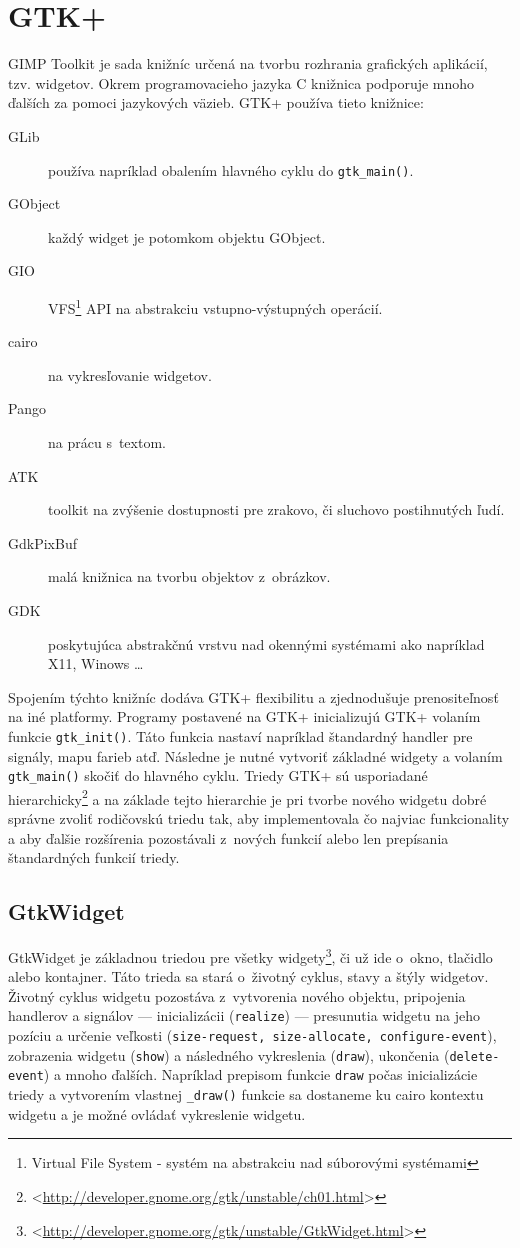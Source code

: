 \documentclass[12pt,oneside,final]{fithesis2}
\begin{document}
\section{GTK+}
GIMP Toolkit je sada knižníc určená na tvorbu rozhrania grafických aplikácií, tzv. widgetov. Okrem programovacieho jazyka C knižnica podporuje mnoho ďalších za pomoci jazykových väzieb. GTK+ používa tieto knižnice:
\begin{description}
\item[GLib] používa napríklad obalením hlavného cyklu do \texttt{gtk\_main()}.
\item[GObject] každý widget je potomkom objektu GObject.
\item[GIO] VFS\footnote{Virtual File System - systém na abstrakciu nad súborovými systémami} API na abstrakciu vstupno-výstupných operácií.
\item[cairo] na vykresľovanie widgetov.
\item[Pango] na prácu s~textom.
\item[ATK] toolkit na zvýšenie dostupnosti pre zrakovo, či sluchovo postihnutých ľudí.
\item[GdkPixBuf] malá knižnica na tvorbu objektov z~obrázkov.
\item[GDK] poskytujúca abstrakčnú vrstvu nad okennými systémami ako napríklad X11, Winows \dots
\end{description}
Spojením týchto knižníc dodáva GTK+ flexibilitu a zjednodušuje prenositeľnosť na iné platformy.
Programy postavené na GTK+ inicializujú GTK+ volaním funkcie \texttt{gtk\_init()}. Táto funkcia nastaví napríklad štandardný handler pre signály, mapu farieb atď. Následne je nutné vytvoriť základné widgety a volaním \texttt{gtk\_main()} skočiť do hlavného cyklu. Triedy GTK+ sú usporiadané hierarchicky\footnote{<\url{http://developer.gnome.org/gtk/unstable/ch01.html}>} a na základe tejto hierarchie je pri tvorbe nového widgetu dobré správne zvoliť rodičovskú triedu tak, aby implementovala čo najviac funkcionality a aby ďalšie rozšírenia pozostávali z~nových funkcií alebo len prepísania štandardných funkcií triedy.
\subsection{GtkWidget}
GtkWidget je základnou triedou pre všetky widgety\footnote{<\url{http://developer.gnome.org/gtk/unstable/GtkWidget.html}>}, či už ide o~okno, tlačidlo alebo kontajner. Táto trieda sa stará o~životný cyklus, stavy a štýly widgetov. Životný cyklus widgetu pozostáva z~vytvorenia nového objektu, pripojenia handlerov a signálov --- inicializácii (\texttt{realize}) --- presunutia widgetu na jeho pozíciu a určenie veľkosti (\texttt{size-request, size-allocate, configure-event}), zobrazenia widgetu (\texttt{show}) a následného vykreslenia (\texttt{draw}), ukončenia (\texttt{delete-event}) a mnoho ďalších. Napríklad prepisom funkcie \texttt{draw} počas inicializácie triedy a vytvorením vlastnej \texttt{\_draw()} funkcie sa dostaneme ku cairo kontextu widgetu a je možné ovládať vykreslenie widgetu.
\end{document}
